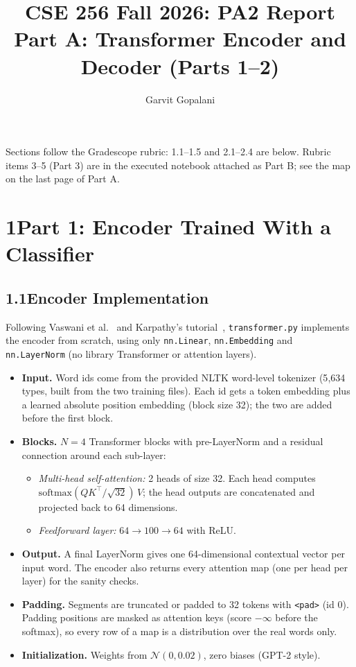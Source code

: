\documentclass[11pt]{article}
\title{\vspace{-2.5em}CSE 256 Fall 2026: PA2 Report\\
\large Part A: Transformer Encoder and Decoder (Parts 1--2)}
\author{Garvit Gopalani}
\date{}
\newcommand{\code}[1]{\texttt{#1}}
\begin{document}
\maketitle
\vspace{-3.2em}

\begin{center}
\small Sections follow the Gradescope rubric: 1.1--1.5 and 2.1--2.4 are below. Rubric items 3--5 (Part 3) are in the executed notebook attached as Part B; see the map on the last page of Part A.
\end{center}

\section*{1\quad Part 1: Encoder Trained With a Classifier}

\subsection*{1.1\quad Encoder Implementation}

Following Vaswani et al.~\cite{vaswani} and Karpathy's tutorial~\cite{karpathy}, \code{transformer.py} implements the encoder from scratch, using only \code{nn.Linear}, \code{nn.Embedding} and \code{nn.LayerNorm} (no library Transformer or attention layers).

\begin{itemize}
  \item \textbf{Input.} Word ids come from the provided NLTK word-level tokenizer (5{,}634 types, built from the two training files). Each id gets a token embedding plus a learned absolute position embedding (block size 32); the two are added before the first block.
  \item \textbf{Blocks.} $N=4$ Transformer blocks with pre-LayerNorm and a residual connection around each sub-layer:
  \begin{itemize}
    \item \emph{Multi-head self-attention:} 2 heads of size 32. Each head computes $\mathrm{softmax}(QK^\top/\sqrt{32})\,V$; the head outputs are concatenated and projected back to 64 dimensions.
    \item \emph{Feedforward layer:} $64 \rightarrow 100 \rightarrow 64$ with ReLU.
  \end{itemize}
  \item \textbf{Output.} A final LayerNorm gives one 64-dimensional contextual vector per input word. The encoder also returns every attention map (one per head per layer) for the sanity checks.
  \item \textbf{Padding.} Segments are truncated or padded to 32 tokens with \code{<pad>} (id 0). Padding positions are masked as attention keys (score $-\infty$ before the softmax), so every row of a map is a distribution over the real words only.
  \item \textbf{Initialization.} Weights from $\mathcal{N}(0, 0.02)$, zero biases (GPT-2 style).
\end{itemize}
\end{document}
